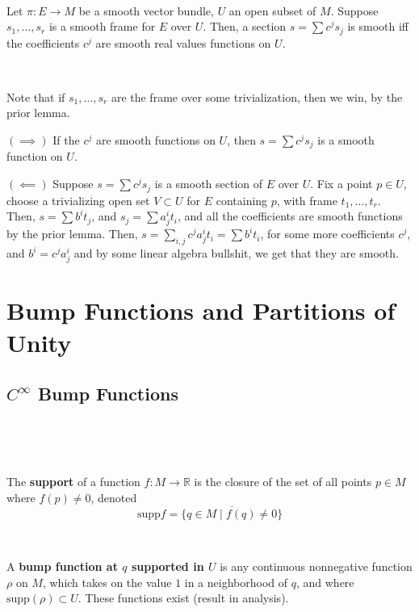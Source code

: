 \documentclass{article}
\begin{document}
\begin{proposition}
  \

  Let $\pi: E \to M$ be a smooth vector bundle, $U$ an open subset of $M$. Suppose $s_1, \dots, s_r$ is a smooth frame for $E$ over $U$. Then, a section $s = \sum c^js_j$ is smooth iff the coefficients $c^j$ are smooth real values functions on $U$.
\end{proposition}

\begin{customproof}
  \

  Note that if $s_1, \dots, s_r$ are the frame over some trivialization, then we win, by the prior lemma.

  $(\implies)$ If the $c^j$ are smooth functions on $U$, then $s = \sum c^js_j$ is a smooth function on $U$.

  $(\impliedby)$ Suppose $s = \sum c^js_j$ is a smooth section of $E$ over $U$. Fix a point $p \in U$, choose a trivializing open set $V \subset U$ for $E$ containing $p$, with frame $t_1, \dots, t_r$. Then, $s = \sum b^i t_j$, and $s_j = \sum a^i_j t_i$, and all the coefficients are smooth functions by the prior lemma. Then, $s = \sum_{i, j} c^ja^i_jt_i = \sum b^i t_i$, for some more coefficients $c^j$, and $b^i = c^ja^i_j$ and by some linear algebra bullshit, we get that they are smooth.
\end{customproof}

\section{Bump Functions and Partitions of Unity}

\subsection{$C^\infty$ Bump Functions}
\

\begin{definition}[Support]
  \

  The \textbf{support} of a function $f: M \to \mathbb{R}$ is the closure of the set of all points $p \in M$ where $f(p) \neq 0$, denoted $$\text{supp} f = \overline{\{q \in M \mid f(q) \neq 0\}}$$
\end{definition}

\begin{definition}
  \

  A \textbf{bump function at $q$ supported in $U$} is any continuous nonnegative function $\rho$ on $M$, which takes on the value $1$ in a neighborhood of $q$, and where $\text{supp}(\rho) \subset U$. These functions exist (result in analysis).
\end{definition}
\end{document}
